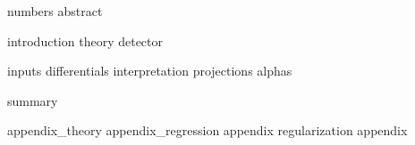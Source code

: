 \documentclass[draftmode]{main}
\begin{document}
{numbers}
{abstract}

\tableofcontents

{introduction}
{theory}
{detector}

{inputs}
{differentials}
{interpretation}
{projections}
{alphas}

{summary}




\appendix
{appendix_theory}
{appendix_regression}
{appendix}
{regularization}
{appendix}
\end{document}

